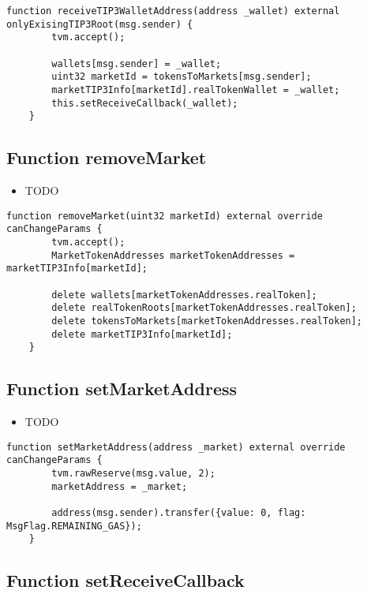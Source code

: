 \begin{lstlisting}[firstnumber=197]
    function receiveTIP3WalletAddress(address _wallet) external onlyExisingTIP3Root(msg.sender) {
        tvm.accept();

        wallets[msg.sender] = _wallet;
        uint32 marketId = tokensToMarkets[msg.sender];
        marketTIP3Info[marketId].realTokenWallet = _wallet;
        this.setReceiveCallback(_wallet);
    }
\end{lstlisting}

\subsection{Function removeMarket}

\noindent\begin{itemize}
\item TODO
\end{itemize}

\begin{lstlisting}[firstnumber=142]
    function removeMarket(uint32 marketId) external override canChangeParams {
        tvm.accept();
        MarketTokenAddresses marketTokenAddresses = marketTIP3Info[marketId];

        delete wallets[marketTokenAddresses.realToken];
        delete realTokenRoots[marketTokenAddresses.realToken];
        delete tokensToMarkets[marketTokenAddresses.realToken];
        delete marketTIP3Info[marketId];
    }
\end{lstlisting}

\subsection{Function setMarketAddress}

\noindent\begin{itemize}
\item TODO
\end{itemize}

\begin{lstlisting}[firstnumber=116]
    function setMarketAddress(address _market) external override canChangeParams {
        tvm.rawReserve(msg.value, 2);
        marketAddress = _market;

        address(msg.sender).transfer({value: 0, flag: MsgFlag.REMAINING_GAS});
    }
\end{lstlisting}

\subsection{Function setReceiveCallback}

